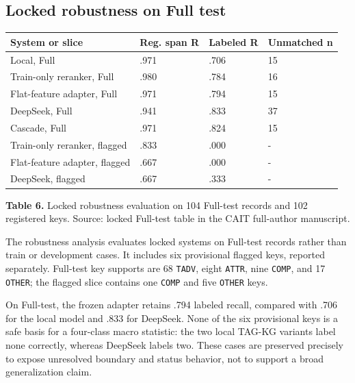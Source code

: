 \documentclass{CUP-JNL-NLP}
\begin{document}
\subsection{Locked robustness on Full test}
\begin{table}[htbp]\centering\small\begin{tabularx}{\linewidth}{lXXX}\toprule
System or slice & Reg. span R & Labeled R & Unmatched n \\ \midrule
Local, Full & .971 & .706 & 15 \\
Train-only reranker, Full & .980 & .784 & 16 \\
Flat-feature adapter, Full & .971 & .794 & 15 \\
DeepSeek, Full & .941 & .833 & 37 \\
Cascade, Full & .971 & .824 & 15 \\
Train-only reranker, flagged & .833 & .000 & - \\
Flat-feature adapter, flagged & .667 & .000 & - \\
DeepSeek, flagged & .667 & .333 & - \\
\bottomrule\end{tabularx}\end{table}
\textbf{Table 6.} Locked robustness evaluation on 104 Full-test records and 102 registered keys. Source: locked Full-test table in the CAIT full-author manuscript.

The robustness analysis evaluates locked systems on Full-test records rather than train or development cases. It includes six provisional flagged keys, reported separately. Full-test key supports are 68 \texttt{TADV}, eight \texttt{ATTR}, nine \texttt{COMP}, and 17 \texttt{OTHER}; the flagged slice contains one \texttt{COMP} and five \texttt{OTHER} keys.

On Full-test, the frozen adapter retains .794 labeled recall, compared with .706 for the local model and .833 for DeepSeek. None of the six provisional keys is a safe basis for a four-class macro statistic: the two local TAG-KG variants label none correctly, whereas DeepSeek labels two. These cases are preserved precisely to expose unresolved boundary and status behavior, not to support a broad generalization claim.
\end{document}
